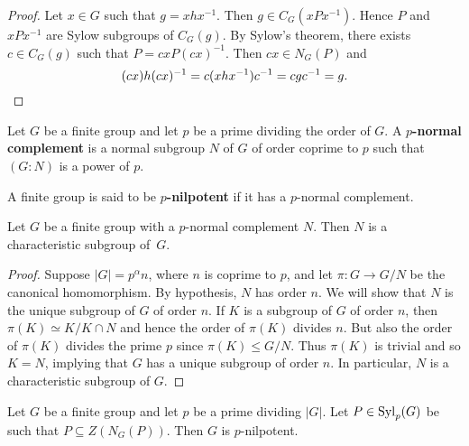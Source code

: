\begin{proof}
	Let $x\in G$ such that $g=xhx^{-1}$. Then $g\in C_G(xPx^{-1})$. Hence $P$ and $xPx^{-1}$ are Sylow subgroups of $C_G(g)$. By Sylow's theorem, there exists $c\in C_G(g)$ such that $P=cxP(cx)^{-1}$. Then $cx\in N_G(P)$ and 
	\[
	(cx)h(cx)^{-1}=c(xhx^{-1})c^{-1}=cgc^{-1}=g.\qedhere
	\]
\end{proof}

\begin{definition}
	Let $G$ be a finite group and let $p$ be a prime dividing the order of $G$. A \textbf{$p$-normal complement} is a normal subgroup $N$ of $G$ of order coprime to $p$ such that $(G:N)$ is a power of $p$.
\end{definition}

\begin{definition}
	A finite group is said to be \textbf{$p$-nilpotent} 
    if it has a $p$-normal complement.
\end{definition}

\begin{proposition}
	Let $G$ be a finite group with a $p$-normal complement $N$. Then 
    $N$ is a characteristic subgroup of~$G$.
\end{proposition}

\begin{proof}
	Suppose $|G|=p^\alpha n$, where $n$ is coprime to $p$, and let $\pi\colon G\to G/N$ be the canonical homomorphism. By hypothesis, $N$ has order $n$. We will show that $N$ is the unique subgroup of $G$ of order $n$. If $K$ is a subgroup of $G$ of order $n$, then $\pi(K)\simeq K/K\cap N$ and hence the order of $\pi(K)$ divides $n$. But also the order of $\pi(K)$ divides the prime $p$ since $\pi(K)\leq G/N$. Thus $\pi(K)$ is trivial and so $K=N$, 
    implying that $G$ has a unique subgroup of order $n$. In particular, $N$ is a characteristic subgroup of $G$.
\end{proof}

\begin{theorem}[Burnside]
	\label{thm:Burnside:normal_complement}
	Let $G$ be a finite group and let $p$ be a prime dividing $|G|$. Let $P\in\mathrm{Syl}_p(G)$ be such that $P\subseteq Z(N_G(P))$. 
    Then $G$ is $p$-nilpotent.
\end{theorem}

